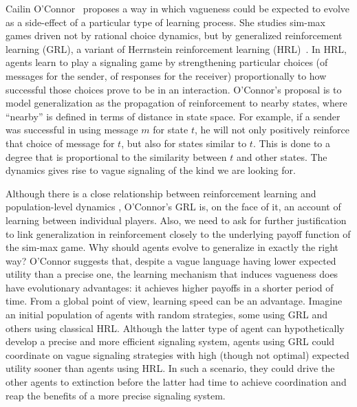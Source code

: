 \documentclass[a4paper]{article}
\begin{document}
Cailin O'Connor~\parencite*{oconnor_evolution_2014} proposes a way in which vagueness could be expected to evolve as a side-effect of a particular type of learning process.
She studies sim-max games driven not by rational choice dynamics, but by generalized reinforcement learning (GRL), a variant of Herrnstein reinforcement learning (HRL)~\parencite{roth_learning_1995}.
In HRL, agents learn to play a signaling game by strengthening particular choices (of messages for the sender, of responses for the receiver) proportionally to how successful those choices prove to be in an interaction.
O'Connor's proposal is to model generalization as the propagation of reinforcement to nearby states, where ``nearby'' is defined in terms of distance in state space.
For example, if a sender was successful in using message $m$ for state $t$, he will not only positively reinforce that choice of message for $t$, but also for states similar to $t$.
This is done to a degree that is proportional to the similarity between $t$ and other states.
The dynamics gives rise to vague signaling of the kind we are looking for.

Although there is a close relationship between reinforcement learning and population-level dynamics \citep{Borgers1997,Beggs2005}, O'Connor's GRL is, on the face of it, an account of learning between individual players.
Also, we need to ask for further justification to link generalization in reinforcement closely to the underlying payoff function of the sim-max game.
Why should agents evolve to generalize in exactly the right way?
O'Connor suggests that, despite a vague language having lower expected utility than a precise one, the learning mechanism that induces vagueness does have evolutionary advantages: it achieves higher payoffs in a shorter period of time.
From a global point of view, learning speed can be an advantage.
Imagine an initial population of agents with random strategies, some using GRL and others using classical HRL.
Although the latter type of agent can hypothetically develop a precise and more efficient signaling system, agents using GRL could coordinate on vague signaling strategies with high (though not optimal) expected utility sooner than agents using HRL.
In such a scenario, they could drive the other agents to extinction before the latter had time to achieve coordination and reap the benefits of a more precise signaling system.
\end{document}
